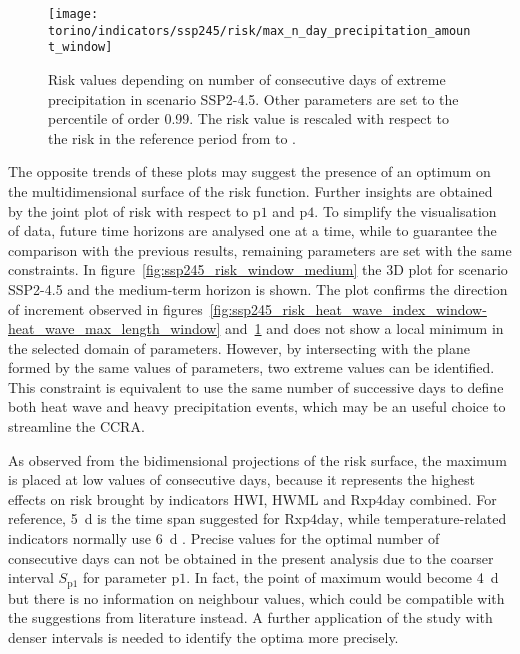 \begin{figure}
  \centering
  \texttt{[image: torino/indicators/ssp245/risk/max\_n\_day\_precipitation\_amount\_window]}
  \caption{Risk values depending on number of consecutive days of extreme precipitation in scenario SSP2-4.5. Other parameters are set to the percentile of order 0.99. The risk value is rescaled with respect to the risk in the reference period from  to .}
  \label{fig:ssp245_risk_max_n_day_precipitation_amount_window}
\end{figure}

The opposite trends of these plots may suggest the presence of an optimum on the multidimensional surface of the risk function. Further insights are obtained by the joint plot of risk with respect to $\mathrm{p1}$ and $\mathrm{p4}$. To simplify the visualisation of data, future time horizons are analysed one at a time, while to guarantee the comparison with the previous results, remaining parameters are set with the same constraints. In figure~\ref{fig:ssp245_risk_window_medium} the 3D plot for scenario SSP2-4.5 and the medium-term horizon is shown. The plot confirms the direction of increment observed in figures~\ref{fig:ssp245_risk_heat_wave_index_window-heat_wave_max_length_window} and~\ref{fig:ssp245_risk_max_n_day_precipitation_amount_window} and does not show a local minimum in the selected domain of parameters. However, by intersecting with the plane formed by the same values of parameters, two extreme values can be identified. This constraint is equivalent to use the same number of successive days to define both heat wave and heavy precipitation events, which may be an useful choice to streamline the \gls{CCRA}.

As observed from the bidimensional projections of the risk surface, the maximum is placed at low values of consecutive days, because it represents the highest effects on risk brought by indicators $\mathrm{HWI}$, $\mathrm{HWML}$ and $\mathrm{Rxp4day}$ combined. For reference, \qty{5}{\day} is the time span suggested for $\mathrm{Rxp4day}$, while temperature-related indicators normally use \qty{6}{\day} \cite[2208]{2021GutierrezAnnexVI}.
Precise values for the optimal number of consecutive days can not be obtained in the present analysis due to the coarser interval $S_\mathrm{p1}$ for parameter $\mathrm{p1}$. In fact, the point of maximum would become \qty{4}{\day} but there is no information on neighbour values, which could be compatible with the suggestions from literature instead. A further application of the study with denser intervals is needed to identify the optima more precisely.

